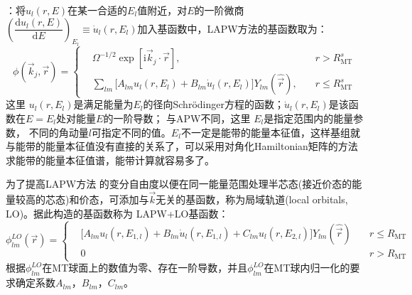 ：将$u_l(r,E)$在某一合适的$E_l$值附近，对$E$的一阶微商$\left(\dfrac{\mathrm{d}u_l(r,E)}{\mathrm{d}E}\right)_{E_l}\equiv\dot u_l(r,E_l)$加入基函数中，LAPW方法的基函数取为：
\begin{equation}
  \phi(\vec k_j,\vec r)=\left\{
  \begin{aligned}
	  &\Omega^{-1/2}\exp[\mathrm{i}\vec k_j\cdot\vec r],&r>R_{\mathrm{MT}}^s\\
    &\sum_{lm}\big[A_{lm}u_l(r,E_l)+B_{lm}\dot u_l(r,E_l)\big]Y_{lm}(\hat{\vec r}),\quad&r\leqslant R_{\mathrm{MT}}^s
  \end{aligned}\right.
  \label{eq:LAPW-basis}
\end{equation}
这里%
$u_l(r,E_l)$是满足能量为$E_l$的径向Schr\"odinger方程的函数；$\dot u_l(r,E_l)$是该函数在$E=E_l$处对能量$E$的一阶导数；%
与\textrm{APW}不同，这里
$E_l$是指定范围内的能量参数，%
不同的角动量$l$可指定不同的值。$E_l$不一定是能带的能量本征值，这样基组就与能带的能量本征值没有直接的关系了，可以采用对角化Hamiltonian矩阵的方法求能带的能量本征值谱，能带计算就容易多了。

为了提高LAPW方法%
的变分自由度以便在同一能量范围处理半芯态(接近价态的能量较高的芯态)和价态，可添加与$\vec k$无关的基函数，称为局域轨道(local orbitals, LO)\cite{PRB43-6388_1991,Singh}。据此构造的基函数称为%
LAPW+LO基函数：
\begin{equation}
\phi_{lm}^{LO}(\vec r)=\left\{
  \begin{aligned}
    &\big[A_{lm}u_l(r,E_{1,l})+B_{lm}\dot u_l(r,E_{1,l})+C_{lm}u_l(r,E_{2,l})\big]Y_{lm}(\hat{\vec r})\quad&r\leqslant R_{\mathrm{MT}}\\
    &0 &r>R_{\mathrm{MT}}
\end{aligned}\right.
  \label{eq:LAPW-LO}
\end{equation}
根据$\phi_{lm}^{LO}$在MT球面上的数值为零、存在一阶导数，并且$\phi_{lm}^{LO}$在MT球内归一化的要求确定系数$A_{lm}$，$B_{lm}$，$C_{lm}$。

